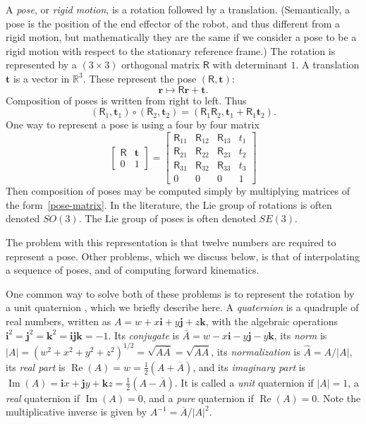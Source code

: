 \documentclass[reqno,12pt]{amsart}
\newcommand\bi{\bm i}
\newcommand\bj{\bm j}
\newcommand\bk{\bm k}
\DeclareMathOperator\realpart{Re}
\DeclareMathOperator\imagpart{Im}
\begin{document}
A \emph{pose}, or \emph{rigid motion}, is a rotation followed by a translation.  (Semantically, a pose is the position of the end effector of the robot, and thus different from a rigid motion, but mathematically they are the same if we consider a pose to be a rigid motion with respect to the stationary reference frame.)  The rotation is represented by a $(3 \times 3)$ orthogonal matrix $\mathsf R$ with determinant $1$.  A translation $\bm t$ is a vector in $\mathbb R^3$.  These represent the pose $(\mathsf R, \bm t)$:
\begin{equation}
\label{pose action}
\bm r \mapsto \mathsf R \bm r + \bm t .
\end{equation}
Composition of poses is written from right to left.  Thus
\begin{equation}
(\mathsf R_1, \bm t_1) \circ (\mathsf R_2, \bm t_2) = (\mathsf R_1 \mathsf R_2, \bm t_1 + \mathsf R_1 \bm t_2).
\end{equation}
One way to represent a pose is using a four by four matrix
\begin{equation}
\label{pose-matrix}
\begin{bmatrix} \mathsf R & \bm t \\ 0 & 1 \end{bmatrix}
 = \begin{bmatrix} \mathsf R_{11} & \mathsf R_{12} & \mathsf R_{13} & t_1 \\
                   \mathsf R_{21} & \mathsf R_{22} & \mathsf R_{23} & t_2 \\
                   \mathsf R_{31} & \mathsf R_{32} & \mathsf R_{33} & t_3 \\
                   0 & 0 & 0 & 1 \end{bmatrix} 
\end{equation}
Then composition of poses may be computed simply by multiplying matrices of the form~\eqref{pose-matrix}.  In the literature, the Lie group of rotations is often denoted $SO(3)$.  The Lie group of poses is often denoted $SE(3)$.

The problem with this representation is that twelve numbers are required to represent a pose.  Other problems, which we discuss below, is that of interpolating a sequence of poses, and of computing forward kinematics.

One common way to solve both of these problems is to represent the rotation by a unit quaternion \cite{quaternions1,quaternions2}, which we briefly describe here.  A \emph{quaternion} is a quadruple of real numbers, written as $A = w + x \bi + y \bj + z \bk$, with the algebraic operations $\bi^2 = \bj^2 = \bk^2 = \bi \bj \bk = -1$.  Its \emph{conjugate} is $\overline A = w - x \bi - y \bj - y \bk$, its \emph{norm} is $|A| = (w^2+x^2+y^2+z^2)^{1/2} = \sqrt{A \overline A} = \sqrt{\overline A A}$, its \emph{normalization} is $\widehat A = A/|A|$, its \emph{real part} is $\realpart(A) = w = \tfrac12(A + \overline A)$, and its \emph{imaginary part} is $\imagpart(A) = \bi x + \bj y + \bk z = \tfrac12(A - \overline A)$.  It is called a \emph{unit} quaternion if $|A| = 1$, a \emph{real} quaternion if $\imagpart(A) = 0$, and a \emph{pure} quaternion if $\realpart(A) = 0$.  Note the multiplicative inverse is given by $A^{-1} = \overline A/|A|^2$.
\end{document}
